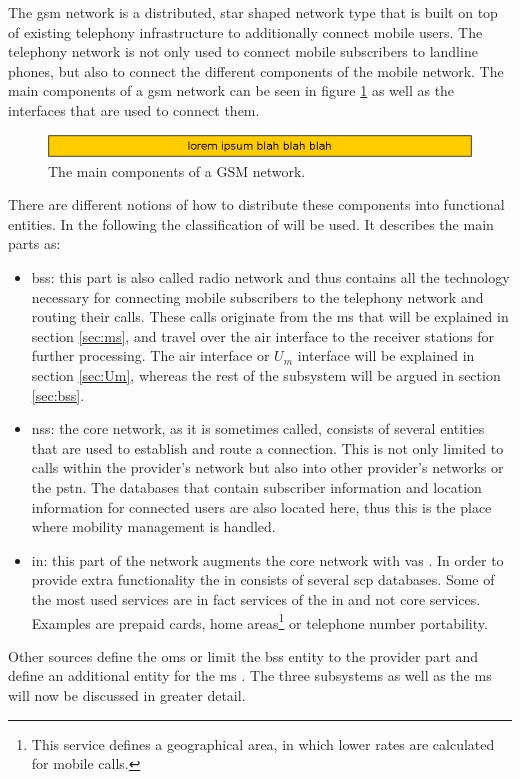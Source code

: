 The \gls{gsm} network is a distributed, star shaped network type that is built on top of existing telephony infrastructure to additionally connect mobile users.
The telephony network is not only used to connect mobile subscribers to landline phones, but also to connect the different components of the mobile network.
The main components of a \gls{gsm} network can be seen in figure \ref{fig:gsm_network} as well as the interfaces that are used to connect them.
\begin{figure}
\centering
\includegraphics{../Images/template}
\caption{The main components of a GSM network.}
\label{fig:gsm_network}
\end{figure}
There are different notions of how to distribute these components into functional entities.
In the following the classification of \cite{kommsys2006} will be used.
It describes the main parts as:
\begin{itemize}
	\item \gls{bss}: this part is also called radio network and thus contains all the technology necessary for connecting mobile subscribers to the telephony network and routing their calls. 
	These calls originate from the \gls{ms} that will be explained in section \ref{sec:ms}, and travel over the air interface to the receiver stations for further processing.
	The air interface or $U_m$ interface will be explained in section \ref{sec:Um}, whereas the rest of the subsystem will be argued in section \ref{sec:bss}.
	\item \gls{nss}: the core network, as it is sometimes called, consists of several entities that are used to establish and route a connection.
	This is not only limited to calls within the provider's network but also into other provider's networks or the \gls{pstn}.
	The databases that contain subscriber information and location information for connected users are also located here, thus this is the place where mobility management is handled.
	\item \gls{in}: this part of the network augments the core network with \gls{vas} \cite{ITU1200}.
	In order to provide extra functionality the \gls{in} consists of several \gls{scp} databases.
	Some of the most used services are in fact services of the \gls{in} and not core services.
	Examples are prepaid cards, home areas\footnote{This service defines a geographical area, in which lower rates are calculated for mobile calls.} or telephone number portability.
\end{itemize}
Other sources define the \gls{oms} \cite{GSM2009} or limit the \gls{bss} entity to the provider part and define an additional entity for the \gls{ms} \cite{overview1994, overview1996}.
The three subsystems as well as the \gls{ms} will now be discussed in greater detail.

